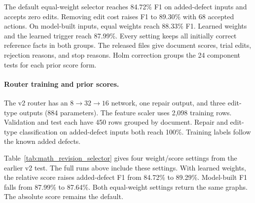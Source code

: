 The default equal-weight selector reaches 84.72\% F1 on added-defect inputs
and accepts zero edits. Removing edit cost raises F1 to 89.30\% with
68 accepted actions. On model-built inputs, equal weights reach 88.33\% F1.
Learned weights and the learned trigger reach 87.99\%.
Every setting keeps all initially correct reference facts in both groups.
The released files give document scores, trial edits, rejection reasons,
and stop reasons. Holm correction groups the 24 component tests for each
prior score form.

\paragraph{Router training and prior scores.}

The v2 router has an $8\!\rightarrow\!32\!\rightarrow\!16$ network,
one repair output, and three edit-type outputs (884 parameters).
The feature scaler uses 2,098 training rows. Validation and test each have
450 rows grouped by document. Repair and edit-type classification on
added-defect inputs both reach 100\%.
Training labels follow the known added defects.



Table~\ref{tab:math_revision_selector} gives four weight/score settings
from the earlier v2 test. The full runs above include these settings.
With learned weights, the relative score raises added-defect F1 from
84.72\% to 89.29\%. Model-built F1 falls from 87.99\% to 87.64\%.
Both equal-weight settings return the same graphs.
The absolute score remains the default.
